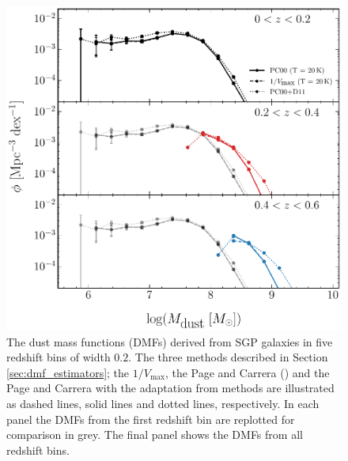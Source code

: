 \begin{figure}
    \centering
    \includegraphics[width=\columnwidth]{Figures/dmf_methods_part1.pdf}
    \caption[Dust mass functions derived from SGP galaxies]{The dust mass functions (DMFs) derived from SGP galaxies in five redshift bins of width $0.2$. The three methods described in Section \ref{sec:dmf_estimators}; the $1/V_{\textrm{max}}$, the Page and Carrera (\citealt{Page_2000}) and the Page and Carrera with the adaptation from \citealt{Dunne_2011} methods are illustrated as dashed lines, solid lines and dotted lines, respectively. In each panel the DMFs from the first redshift bin are replotted for comparison in grey. The final panel shows the DMFs from all redshift bins.}
	\label{fig:dmf_methods}
\end{figure}

